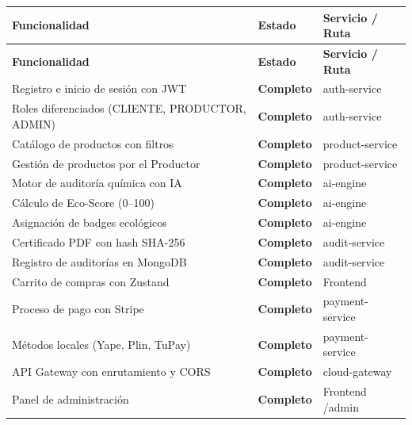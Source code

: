 \documentclass[12pt,a4paper]{article}
\begin{document}
\begin{center}
\begin{longtable}{|L{7.5cm}|C{2.2cm}|L{4.3cm}|}
\hline
{}
\color{white}\textbf{Funcionalidad} &
\color{white}\textbf{Estado} &
\color{white}\textbf{Servicio / Ruta} \\
\hline
\endfirsthead
\hline
{}
\color{white}\textbf{Funcionalidad} &
\color{white}\textbf{Estado} &
\color{white}\textbf{Servicio / Ruta} \\
\hline
\endhead

Registro e inicio de sesi\'on con JWT              & \textbf{Completo}   & auth-service \\
\hline
{}
Roles diferenciados (CLIENTE, PRODUCTOR, ADMIN)    & \textbf{Completo}   & auth-service \\
\hline
Cat\'alogo de productos con filtros                & \textbf{Completo}   & product-service \\
\hline
{}
Gesti\'on de productos por el Productor            & \textbf{Completo}   & product-service \\
\hline
Motor de auditor\'ia qu\'imica con IA              & \textbf{Completo}   & ai-engine \\
\hline
{}
C\'alculo de Eco-Score (0--100)                    & \textbf{Completo}   & ai-engine \\
\hline
Asignaci\'on de badges ecol\'ogicos                & \textbf{Completo}   & ai-engine \\
\hline
{}
Certificado PDF con hash SHA-256                   & \textbf{Completo}   & audit-service \\
\hline
Registro de auditor\'ias en MongoDB                & \textbf{Completo}   & audit-service \\
\hline
{}
Carrito de compras con Zustand                     & \textbf{Completo}   & Frontend \\
\hline
Proceso de pago con Stripe                         & \textbf{Completo}   & payment-service \\
\hline
{}
M\'etodos locales (Yape, Plin, TuPay)              & \textbf{Completo}   & payment-service \\
\hline
API Gateway con enrutamiento y CORS                & \textbf{Completo}   & cloud-gateway \\
\hline
{}
Panel de administraci\'on                          & \textbf{Completo}   & Frontend /admin \\

\end{longtable}
\end{center}
\end{document}
